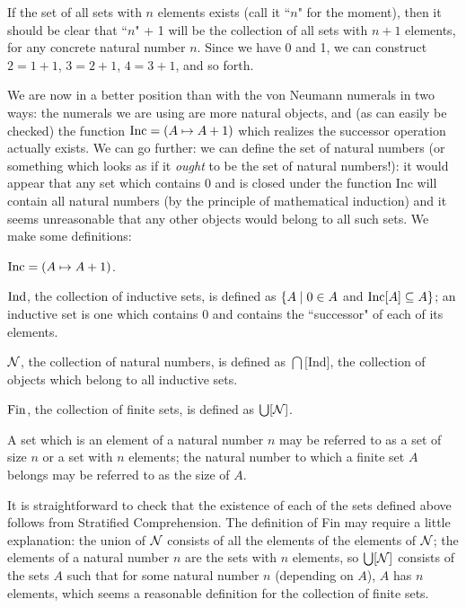 If the set of all sets with $n$ elements exists (call it ``$n$" for
the moment), then it should be clear that ``$n$" + 1 will be the
collection of all sets with $n+1$ elements, for any concrete natural
number $n$.  Since we have 0 and 1, we can construct $2 = 1 + 1$, $3 = 2
+ 1$, $4 = 3 + 1$, and so forth.

We are now in a better position than with the von Neumann numerals in two ways: the numerals we are using are more natural
objects, and (as can easily be checked) the function
$\mathop{\mathrm{Inc}} = (A \mapsto  A + 1)$ which realizes the successor operation actually
exists.  We can go 
further: we can define the set of natural numbers (or something which
looks as if it {\itshape ought\/} to be the set of natural numbers!): it would
appear that any set which contains 0 and is closed under the function
Inc will contain all natural numbers (by the principle of mathematical
induction) and it seems unreasonable that any other objects would
belong to all such sets.  We make some definitions:

\begin{definitions}
 $\mathop{\mathrm{Inc}} = (A \mapsto  A + 1)$.

 $\mathrm{Ind}$, the collection of\/ {\upshape inductive sets}, is  defined as
   $\{A \mid 0 \in A$ and $\mathop{\mathrm{Inc}}[A] \subseteq A\}$; an inductive set is one which
   contains 0 and contains the ``successor" of
   each of its elements. 

 ${\cal N}$, the collection of {\upshape natural numbers}, is  defined as $\bigcap [$Ind$]$, the collection of objects
   which belong to all inductive sets.

 $\mathrm{Fin}$, the collection of {\upshape finite
   sets},
   is defined as $\bigcup[{\cal N}]$.

 A set which is an element of a natural number $n$
   may be referred to as a {\upshape set of size $n$\/} or {\upshape a set with
   $n$ elements}; the natural number to which a finite set $A$ belongs may
   be referred to as the {\upshape size of $A$\/}.
\end{definitions}

It is straightforward to check that the existence of each of the sets
defined above follows from Stratified Comprehension.  The definition 
of Fin may require a little explanation: the union of ${\cal
N}$ consists of all the elements of the elements of ${\cal N}$; the
elements of a natural number $n$ are the sets with $n$ elements, so
$\bigcup[{\cal N}]$ consists of the sets $A$ such that for some
natural number $n$ (depending on $A$), $A$ has $n$ elements, which
seems a reasonable definition for the collection of finite sets.

